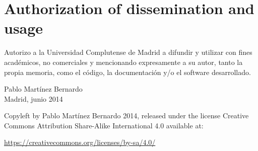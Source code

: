 
\newpage
\thispagestyle{empty}
\chapter*{Authorization of dissemination and usage}
\vfill
Autorizo a la Universidad Complutense de Madrid a difundir y utilizar con fines académicos, no comerciales y mencionando expresamente a su autor, tanto la propia memoria, como el código, la documentación y/o el software desarrollado. 
\begin{center}
  \vfill
  {\Large Pablo Martínez Bernardo\\}
  \vspace*{4cm}
  {\Large Madrid, junio 2014}
  \vfill
\end{center}
  Copyleft by Pablo Martínez Bernardo 2014, released under the license Creative Commons Attribution Share-Alike International 4.0 available at:
\begin{center}
\url{https://creativecommons.org/licenses/by-sa/4.0/}
\end{center}

\newpage
\tableofcontents
\newpage
\setcounter{page}{7}
{\listoffigures \let\cleardoublepage\relax \listoftables}
\newpage
